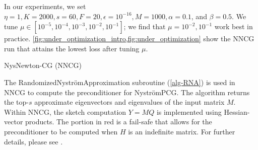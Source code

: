 In our experiments, we set $\eta = 1, K = 2000, s = 60, F = 20, \epsilon = 10^{-16}, M = 1000, \alpha = 0.1$, and $\beta = 0.5$.
We tune $\mu \in [10^{-5}, 10^{-4}, 10^{-3}, 10^{-2}, 10^{-1}]$; we find that $\mu = 10^{-2}, 10^{-1}$ work best in practice.
\cref{fig:under_optimization_intro,fig:under_optimization} show the NNCG run that attains the lowest loss after tuning $\mu$.

\begin{algorithm}[H]
	\centering
	\caption{NysNewton-CG (NNCG)}
	\label{alg-NNCG}
	\begin{algorithmic}
             
        \ENDIF
         
         
         
    \ENDFOR
	\end{algorithmic}
\end{algorithm}

The RandomizedNystr{\"o}mApproximation subroutine (\cref{alg-RNA}) is used in NNCG to compute the preconditioner for Nystr\"{o}mPCG.
The algorithm returns the top-$s$ approximate eigenvectors and eigenvalues of the input matrix $M$.
Within NNCG, the sketch computation $Y = MQ$ is implemented using Hessian-vector products.
The portion in red is a fail-safe that allows for the preconditioner to be computed when $H$ is an indefinite matrix.
For further details, please see \citet{frangella2023randomized}.


